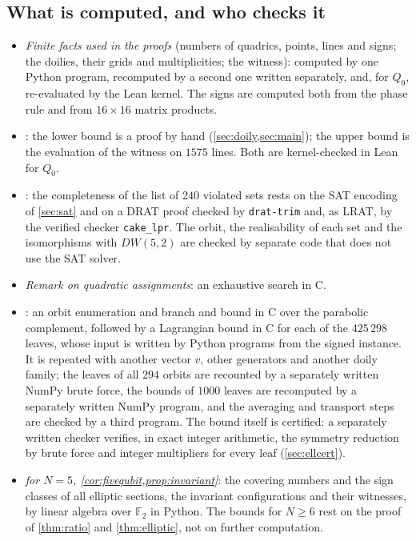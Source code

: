 \documentclass[11pt]{article}
\theoremstyle{definition}
\theoremstyle{remark}
\newcommand{\F}{\mathbb{F}}
\begin{document}
\subsection{What is computed, and who checks it}
\begin{itemize}[leftmargin=*]
\item \emph{Finite facts used in the proofs} (numbers of quadrics, points, lines and signs; the doilies, their grids and multiplicities; the witness): computed by one Python program, recomputed by a second one written separately, and, for $Q_0$, re-evaluated by the Lean kernel. The signs are computed both from the phase rule and from $16\times16$ matrix products.
\item \emph{}: the lower bound is a proof by hand (\cref{sec:doily,sec:main}); the upper bound is the evaluation of the witness on $1575$ lines. Both are kernel-checked in Lean for $Q_0$.
\item \emph{}: the completeness of the list of $240$ violated sets rests on the SAT encoding of \cref{sec:sat} and on a DRAT proof checked by \texttt{drat-trim} and, as LRAT, by the verified checker \texttt{cake\_lpr}. The orbit, the realisability of each set and the isomorphisms with $DW(5,2)$ are checked by separate code that does not use the SAT solver.
\item \emph{Remark on quadratic assignments}: an exhaustive search in C.
\item \emph{}: an orbit enumeration and branch and bound in C over the parabolic complement, followed by a Lagrangian bound in C for each of the $425\,298$ leaves, whose input is written by Python programs from the signed instance. It is repeated with another vector $v$, other generators and another doily family; the leaves of all $294$ orbits are recounted by a separately written NumPy brute force, the bounds of $1000$ leaves are recomputed by a separately written NumPy program, and the averaging and transport steps are checked by a third program. The bound itself is certified: a separately written checker verifies, in exact integer arithmetic, the symmetry reduction by brute force and integer multipliers for every leaf (\cref{sec:ellcert}).
\item \emph{ for $N=5$, \cref{cor:fivequbit,prop:invariant}}: the covering numbers and the sign classes of all elliptic sections, the invariant configurations and their witnesses, by linear algebra over $\F_2$ in Python. The bounds for $N\ge6$ rest on the proof of \cref{thm:ratio} and \cref{thm:elliptic}, not on further computation.
\end{itemize}
\end{document}
